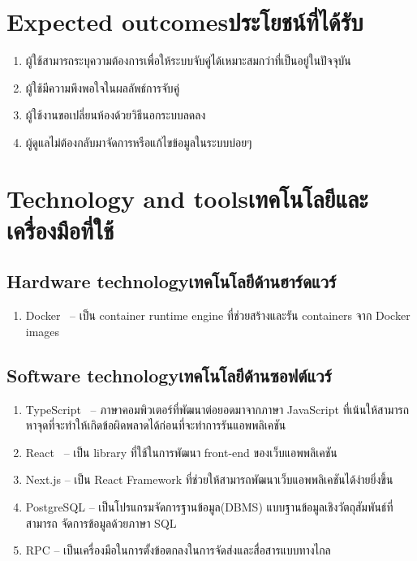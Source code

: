 \section{\ifenglish Expected outcomes\else ประโยชน์ที่ได้รับ\fi}
\begin{enumerate}
    \item ผู้ใช้สามารถระบุความต้องการเพื่อให้ระบบจับคู่ได้เหมาะสมกว่าที่เป็นอยู่ในปัจจุบัน
    \item ผู้ใช้มีความพึงพอใจในผลลัพธ์การจับคู่
    \item ผู้ใช้งานขอเปลี่ยนห้องด้วยวิธีนอกระบบลดลง
    \item ผู้ดูแลไม่ต้องกลับมาจัดการหรือแก้ไขข้อมูลในระบบบ่อยๆ
\end{enumerate}

\section{\ifenglish Technology and tools\else เทคโนโลยีและเครื่องมือที่ใช้\fi}

\subsection{\ifenglish Hardware technology\else เทคโนโลยีด้านฮาร์ดแวร์\fi}
\begin{enumerate}
    \item Docker~\cite{dke} -- เป็น container runtime engine ที่ช่วยสร้างและรัน containers จาก Docker images
\end{enumerate}

\subsection{\ifenglish Software technology\else เทคโนโลยีด้านซอฟต์แวร์\fi}
\begin{enumerate}
    \item TypeScript~\cite{typescript} -- ภาษาคอมพิวเตอร์ที่พัฒนาต่อยอดมาจากภาษา JavaScript
          ที่เน้นให้สามารถหาจุดที่จะทำให้เกิดข้อผิดพลาดได้ก่อนที่จะทำการรันแอพพลิเคชัน
    \item React~\cite{react} -- เป็น library ที่ใช้ในการพัฒนา front-end ของเว็บแอพพลิเคชัน
    \item Next.js\cite{nextjs} -- เป็น React Framework ที่ช่วยให้สามารถพัฒนาเว็บแอพพลิเคชันได้ง่ายยิ่งขึ้น
    \item PostgreSQL -- เป็นโปรแกรมจัดการฐานข้อมูล(DBMS) แบบฐานข้อมูลเชิงวัตถุสัมพันธ์ที่สามารถ จัดการข้อมูลด้วยภาษา SQL
    \item RPC -- เป็นเครื่องมือในการตั้งข้อตกลงในการจัดส่งและสื่อสารแบบทางไกล
\end{enumerate}

